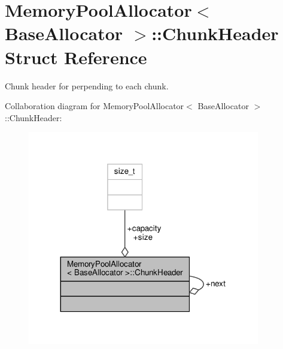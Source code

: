 \hypertarget{structMemoryPoolAllocator_1_1ChunkHeader}{}\section{Memory\+Pool\+Allocator$<$ Base\+Allocator $>$\+:\+:Chunk\+Header Struct Reference}
\label{structMemoryPoolAllocator_1_1ChunkHeader}


Chunk header for perpending to each chunk.  




Collaboration diagram for Memory\+Pool\+Allocator$<$ Base\+Allocator $>$\+:\+:Chunk\+Header\+:
\nopagebreak
\begin{figure}[H]
\begin{center}
\leavevmode
\includegraphics[width=287pt]{structMemoryPoolAllocator_1_1ChunkHeader__coll__graph}
\end{center}
\end{figure}
